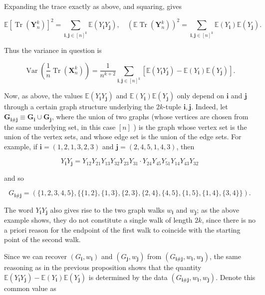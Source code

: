 \documentclass[10pt]{article}
\begin{document}
Expanding the trace exactly as above, and squaring, gives

$$
\mathbb{E}\left[\operatorname{Tr}\left(\mathbf{Y}_{n}^{k}\right)\right]^{2}=\sum_{\mathbf{i}, \mathbf{j} \in[n]^{k}} \mathbb{E}\left(Y_{\mathbf{i}} Y_{\mathbf{j}}\right), \quad\left(\mathbb{E} \operatorname{Tr}\left(\mathbf{Y}_{n}^{k}\right)\right)^{2}=\sum_{\mathbf{i}, \mathbf{j} \in[n]^{k}} \mathbb{E}\left(Y_{\mathbf{i}}\right) \mathbb{E}\left(Y_{\mathbf{j}}\right) .
$$

Thus the variance in question is

$$
\operatorname{Var}\left(\frac{1}{n} \operatorname{Tr}\left(\mathbf{X}_{n}^{k}\right)\right)=\frac{1}{n^{k+2}} \sum_{\mathbf{i}, \mathbf{j} \in[n]^{k}}\left[\mathbb{E}\left(Y_{\mathbf{i}} Y_{\mathbf{j}}\right)-\mathbb{E}\left(Y_{\mathbf{i}}\right) \mathbb{E}\left(Y_{\mathbf{j}}\right)\right] .
$$

Now, as above, the values $\mathbb{E}\left(Y_{\mathbf{i}} Y_{\mathbf{j}}\right)$ and $\mathbb{E}\left(Y_{\mathbf{i}}\right) \mathbb{E}\left(Y_{\mathbf{j}}\right)$ only depend on $\mathbf{i}$ and $\mathbf{j}$ through a certain graph structure underlying the $2 k$-tuple $\mathbf{i}, \mathbf{j}$. Indeed, let $\mathbf{G}_{\mathbf{i} \# \mathbf{j}} \equiv \mathbf{G}_{\mathbf{i}} \cup \mathbf{G}_{\mathbf{j}}$, where the union of two graphs (whose vertices are chosen from the same underlying set, in this case $[n]$ ) is the graph whose vertex set is the union of the vertex sets, and whose edge set is the union of the edge sets. For example, if $\mathbf{i}=(1,2,1,3,2,3)$ and $\mathbf{j}=(2,4,5,1,4,3)$, then

$$
Y_{\mathbf{i}} Y_{\mathbf{j}}=Y_{12} Y_{21} Y_{13} Y_{32} Y_{23} Y_{31} \cdot Y_{24} Y_{45} Y_{51} Y_{14} Y_{43} Y_{32}
$$

and so

$$
G_{\mathbf{i} \# \mathbf{j}}=(\{1,2,3,4,5\},\{\{1,2\},\{1,3\},\{2,3\},\{2,4\},\{4,5\},\{1,5\},\{1,4\},\{3,4\}\}) .
$$

The word $Y_{\mathbf{i}} Y_{\mathbf{j}}$ also gives rise to the two graph walks $w_{\mathbf{i}}$ and $w_{\mathbf{j}}$; as the above example shows, they do not constitute a single walk of length $2 k$, since there is no a priori reason for the endpoint of the first walk to coincide with the starting point of the second walk.

Since we can recover $\left(G_{\mathbf{i}}, w_{\mathbf{i}}\right)$ and $\left(G_{\mathbf{j}}, w_{\mathbf{j}}\right)$ from $\left(G_{\mathbf{i} \# \mathbf{j}}, w_{\mathbf{i}}, w_{\mathbf{j}}\right)$, the same reasoning as in the previous proposition shows that the quantity $\mathbb{E}\left(Y_{\mathbf{i}} Y_{\mathbf{j}}\right)-\mathbb{E}\left(Y_{\mathbf{i}}\right) \mathbb{E}\left(Y_{\mathbf{j}}\right)$ is determined by the data $\left(G_{\mathbf{i} \# \mathbf{j}}, w_{\mathbf{i}}, w_{\mathbf{j}}\right)$. Denote this common value as
\end{document}
